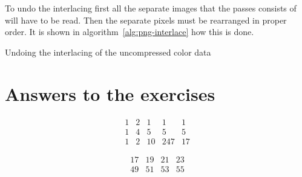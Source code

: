 To undo the interlacing first all the separate images that the passes
consists of will have to be read. Then the separate pixels must be
rearranged in proper order. It is shown in
algorithm~\ref{alg:png-interlace} how this is done.

\begin{algorithm}[H]
  \caption{Undoing the interlacing of the uncompressed \png color data}
  \label{alg:png-interlace}
  \begin{algorithmic}[1]








    \EndWhile


    \EndWhile

    \EndForTo

  \end{algorithmic}
\end{algorithm}



\section{Answers to the exercises}

\begin{Answer}[ref={filter-1}]

  \[
  \begin{matrix}
    1 & 2 & 1 & 1 & 1 \\
    1 & 4 & 5 & 5 & 5 \\
    1 & 2 & 10 & 247 & 17
  \end{matrix}
  \]

\end{Answer}

\begin{Answer}[ref={ex-interlace}]

  \[
  \begin{matrix}
    17 & 19 & 21 & 23 \\
    49 & 51 & 53 & 55
  \end{matrix}
  \]


\end{Answer}



